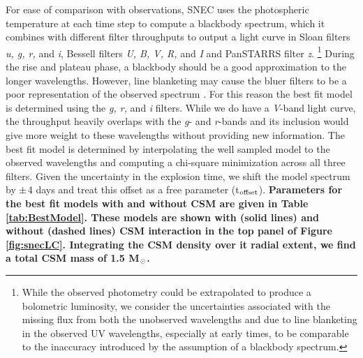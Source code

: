 \documentclass[a4paper,fleqn,usenatbib]{mnras}
\newcommand{\msunperiod}{M$\rm{_{\odot}}$}
\begin{document}
For ease of comparison with observations, SNEC uses the photospheric temperature at each time step to compute a blackbody spectrum, which it combines with different filter throughputs to output a light curve in Sloan filters {\it u, g, r,} and {\it i}, Bessell filters {\it U, B, V, R,} and {\it I} and PanSTARRS filter {\it z}. 
\footnote{While the observed photometry could be extrapolated to produce a bolometric luminosity, we consider the uncertainties associated with the missing flux from both the unobserved wavelengths and due to line blanketing in the observed UV wavelengths, especially at early times, to be comparable to the inaccuracy introduced by the assumption of a blackbody spectrum.}
During the rise and plateau phase, a blackbody should be a good approximation to the longer wavelengths. 
However, line blanketing may cause the bluer filters to be a poor representation of the observed spectrum \citep{2009kasen,2005dessart}.
For this reason the best fit model is determined using the {\it g, r,} and {\it i} filters. 
While we do have a {\it V}-band light curve, the throughput heavily overlaps with the {\it g}- and {\it r}-bands and its inclusion would give more weight to these wavelengths without providing new information.
The best fit model is determined by interpolating the well sampled model to the observed wavelengths and computing a chi-square minimization across all three filters.
Given the uncertainty in the explosion time, we shift the model spectrum by $\rm{\pm}$4 days and treat this offset as a free parameter (t$\rm{_{offset}}$).
\textbf{Parameters for the best fit models with and without CSM are given in Table \ref{tab:BestModel}. 
These models are shown with (solid lines) and without (dashed lines) CSM interaction in the top panel of Figure \ref{fig:snecLC}. 
Integrating the CSM density over it radial extent, we find a total CSM mass of 1.5 \msunperiod. }
\end{document}
